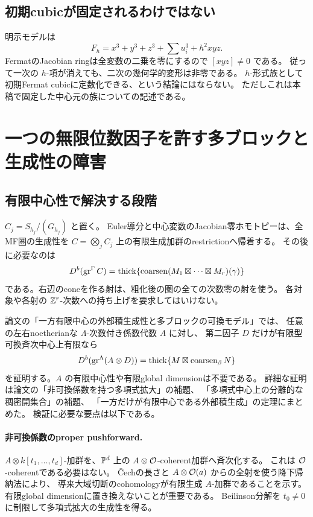 \subsection{初期cubicが固定されるわけではない}

明示モデルは
\[
 F_h=x^3+y^3+z^3+\sum u_i^3+h^2xyz.
\]
FermatのJacobian ringは全変数の二乗を零にするので \([xyz]\ne0\) である。
従って一次の \(h\)-項が消えても、二次の幾何学的変形は非零である。
\(h\)-形式族として初期Fermat cubicに定数化できる、という結論にはならない。
ただしこれは本稿で固定した中心元の族についての記述である。

\section{一つの無限位数因子を許す多ブロックと生成性の障害}

\subsection{有限中心性で解決する段階}

\(C_j=S_{h_j}/(G_{h_j})\) と置く。
Euler導分と中心変数のJacobian零ホモトピーは、全MF圏の生成性を
\(C=\bigotimes_j C_j\) 上の有限生成加群のrestrictionへ帰着する。
その後に必要なのは
\[
 D^b(\operatorname{gr}^{\Gamma}C)
 =\operatorname{thick}\{\operatorname{coarsen}(M_1\boxtimes\cdots\boxtimes M_r)(\gamma)\}
\]
である。右辺のconeを作る射は、粗化後の圏の全ての次数零の射を使う。
各対象や各射の \(\mathbb Z^r\)-次数への持ち上げを要求してはいけない。

論文の「一方有限中心の外部積生成性と多ブロックの可換モデル」では、
任意の左右noetherianな \(\Lambda\)-次数付き係数代数 \(A\) に対し、
第二因子 \(D\) だけが有限型可換斉次中心上有限なら
\[
 D^b(\operatorname{gr}^{\Lambda}(A\otimes D))
 =\operatorname{thick}\{M\boxtimes\operatorname{coarsen}_\beta N\}
\]
を証明する。\(A\) の有限中心性や有限global dimensionは不要である。
詳細な証明は論文の「非可換係数を持つ多項式拡大」の補題、
「多項式中心上の分離的な稠密開集合」の補題、
「一方だけが有限中心である外部積生成」の定理にまとめた。
検証に必要な要点は以下である。

\paragraph{非可換係数のproper pushforward.}
\(A\otimes k[t_1,\ldots,t_d]\)-加群を、\(\mathbb P^d\) 上の
\(A\otimes\mathcal O\)-coherent加群へ斉次化する。
これは \(\mathcal O\)-coherentである必要はない。
\v Cechの長さと \(A\otimes\mathcal O(a)\) からの全射を使う降下帰納法により、
導来大域切断のcohomologyが有限生成 \(A\)-加群であることを示す。
有限global dimensionに置き換えないことが重要である。
Beilinson分解を \(t_0\ne0\) に制限して多項式拡大の生成性を得る。

